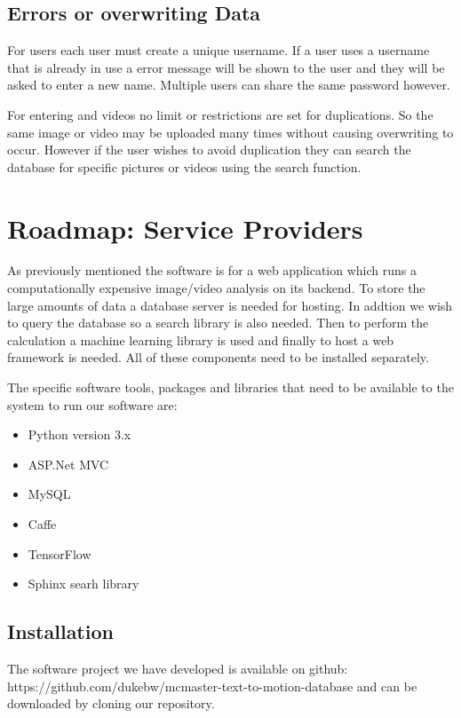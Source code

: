 \documentclass{scrreprt}
\begin{document}
\subsection{Errors or overwriting Data}

For users each user must create a unique username.  If a user uses a username
that is already in use a error message will be shown to the user and they will
be asked to enter a new name.  Multiple users can share the same password
however.

For entering and videos no limit or restrictions are set for duplications.  So
the same image or video may be uploaded many times without causing overwriting
to occur.  However if the user wishes to avoid duplication they can search the
database for specific pictures or videos using the search function.


\section{Roadmap: Service Providers}

As previously mentioned the software is for a  web application which runs a
computationally expensive image/video analysis on its backend. To store the
large amounts of data a database server is needed for hosting.  In addtion we
wish to query the database so a search library is also needed. Then to perform
the calculation a machine learning library is used and finally to host a web
framework is needed. All of these components need to be installed separately.

The specific software tools, packages and libraries that need to be available
to the system to run our software are:

\begin{itemize}
  \item Python version 3.x
  \item ASP.Net MVC
  \item MySQL
  \item Caffe
  \item TensorFlow
  \item Sphinx searh library
\end{itemize}



\subsection{Installation}

The software project we have developed is available on github:
https://github.com/dukebw/mcmaster-text-to-motion-database and can be
downloaded by cloning our repository.
\end{document}
